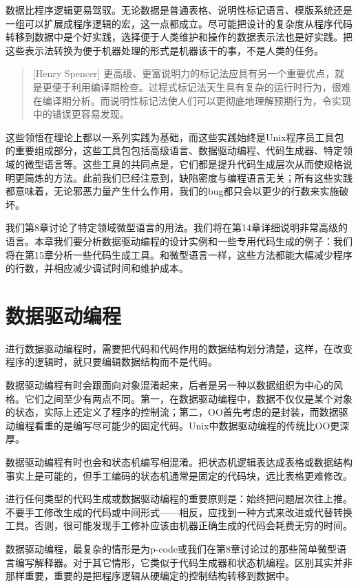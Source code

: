 \documentclass[12pt,oneside]{book}
\begin{document}
数据比程序逻辑更易驾驭。无论数据是普通表格、说明性标记语言、模版系统还是一组可以扩展成程序逻辑的宏，这一点都成立。尽可能把设计的复杂度从程序代码转移到数据中是个好实践，选择便于人类维护和操作的数据表示法也是好实践。把这些表示法转换为便于机器处理的形式是机器该干的事，不是人类的任务。
\begin{quote}[Henry Spencer]
更高级、更富说明力的标记法应具有另一个重要优点，就是更便于利用编译期检查。过程式标记法天生具有复杂的运行时行为，很难在编译期分析。而说明性标记法使人们可以更彻底地理解预期行为，令实现中的错误更容易发现。
\end{quote}

这些领悟在理论上都以一系列实践为基础，而这些实践始终是Unix程序员工具包的重要组成部分，这些工具包包括高级语言、数据驱动编程、代码生成器、特定领域的微型语言等。这些工具的共同点是，它们都是提升代码生成层次从而使规格说明更简炼的方法。此前我们已经注意到，缺陷密度与编程语言无关；所有这些实践都意味着，无论邪恶力量产生什么作用，我们的bug都只会以更少的行数来实施破坏。

我们第8章讨论了特定领域微型语言的用法。我们将在第14章详细说明非常高级的语言。本章我们要分析数据驱动编程的设计实例和一些专用代码生成的例子：我们将在第15章分析一些代码生成工具。和微型语言一样，这些方法都能大幅减少程序的行数，并相应减少调试时间和维护成本。


\section{数据驱动编程}
进行数据驱动编程时，需要把代码和代码作用的数据结构划分清楚，这样，在改变程序的逻辑时，就只要编辑数据结构而不是代码。

数据驱动编程有时会跟面向对象混淆起来，后者是另一种以数据组织为中心的风格。它们之间至少有两点不同。第一，在数据驱动编程中，数据不仅仅是某个对象的状态，实际上还定义了程序的控制流；第二，OO首先考虑的是封装，而数据驱动编程看重的是编写尽可能少的固定代码。Unix中数据驱动编程的传统比OO更深厚。

数据驱动编程有时也会和状态机编写相混淆。把状态机逻辑表达成表格或数据结构事实上是可能的，但手工编码的状态机通常是固定的代码块，远比表格更难修改。

进行任何类型的代码生成或数据驱动编程的重要原则是：始终把问题层次往上推。不要手工修改生成的代码或中间形式——相反，应找到一种方式来改进或代替转换工具。否则，很可能发现手工修补应该由机器正确生成的代码会耗费无穷的时间。

数据驱动编程，最复杂的情形是为p-code或我们在第8章讨论过的那些简单微型语言编写解释器。对于其它情形，它类似于代码生成器和状态机编程。区别其实并非那样重要，重要的是把程序逻辑从硬编定的控制结构转移到数据中。
\end{document}

